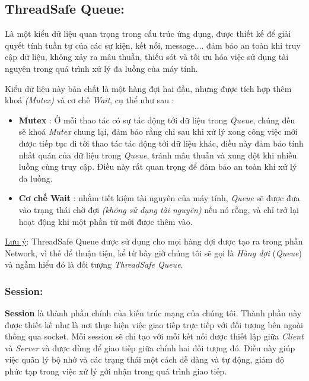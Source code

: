 \subsection{ThreadSafe Queue: }

Là một kiểu dữ liệu quan trọng trong cấu trúc ứng dụng, được thiết kế để giải quyết tính tuần tự của các sự kiện, kết nối, message....  đảm bảo an toàn khi truy cập dữ liệu, không xảy ra mâu thuẫn, thiếu sót và tối ưu hóa việc sử dụng tài nguyên trong quá trình xử lý đa luồng của máy tính.

Kiểu dữ liệu này bản chất là một hàng đợi hai đầu, nhưng được tích hợp thêm khoá \textit{(Mutex)} và cơ chế \textit{Wait}, cụ thể như sau :
\begin{itemize}
	\item \textbf{Mutex} : Ở mỗi thao tác có sự tác động tới dữ liệu trong \textit{Queue}, chúng đều sẽ khoá \textit{Mutex} chung lại, đảm bảo rằng chỉ sau khi xử lý xong công việc mới được tiếp tục đi tới thao tác tác động tới dữ liệu khác, điều này đảm bảo tính nhất quán của dữ liệu trong \textit{Queue}, tránh mâu thuẫn và xung đột khi nhiều luồng cùng truy cập. Điều này rất quan trọng để đảm bảo an toàn khi xử lý đa luồng.
	\item \textbf{Cơ chế Wait} : nhằm tiết kiệm tài nguyên của máy tính, \textit{Queue} sẽ được đưa vào trạng thái chờ đợi \textit{(không sử dụng tài nguyên)} nếu nó rỗng, và chỉ trở lại hoạt động khi một phần tử mới được thêm vào.
\end{itemize}

\underline{Lưu ý}: ThreadSafe Queue được sử dụng cho mọi hàng đợi được tạo ra trong phần Network, vì thế để thuận tiện, kể từ bây giờ chúng tôi sẽ gọi là \textit{Hàng đợi} (\textit{Queue}) và ngầm hiểu đó là đối tượng \textit{ThreadSafe Queue}.

\subsubsection{Session: }
\textbf{Session} là thành phần chính của kiến trúc mạng của chúng tôi. Thành phần này được thiết kế như là nơi thực hiện việc giao tiếp trực tiếp với đối tượng bên ngoài thông qua socket. Mỗi session sẽ chỉ tạo với mỗi kết nối được thiết lập giữa \textit{Client} và \textit{Server} và được dùng để giao tiếp giữa chính hai đối tượng đó. Điều này giúp việc quãn lý bộ nhớ và các trạng thái một cách dễ dàng và tự động, giảm độ phức tạp trong việc xử lý gởi nhận trong quá trình giao tiếp.

